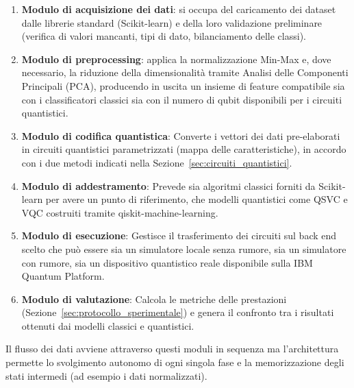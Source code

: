 \begin{enumerate}
    \item \textbf{Modulo di acquisizione dei dati}: si occupa del caricamento dei dataset dalle librerie standard (Scikit-learn) e della loro validazione preliminare (verifica di valori mancanti, tipi di dato, bilanciamento delle classi).
    \item \textbf{Modulo di preprocessing}: applica la normalizzazione Min-Max e, dove necessario, la riduzione della dimensionalità tramite Analisi delle Componenti Principali (PCA), producendo in uscita un insieme di feature compatibile sia con i classificatori classici sia con il numero di qubit disponibili per i circuiti quantistici.
    \item \textbf{Modulo di codifica quantistica}: Converte i vettori dei dati pre-elaborati in circuiti quantistici parametrizzati (mappa delle caratteristiche), in accordo con i due metodi indicati nella Sezione~\ref{sec:circuiti_quantistici}.
    \item \textbf{Modulo di addestramento}: Prevede sia algoritmi classici forniti da Scikit-learn per avere un punto di riferimento, che modelli quantistici come QSVC e VQC costruiti tramite qiskit-machine-learning.
    \item \textbf{Modulo di esecuzione}: Gestisce il trasferimento dei circuiti sul back end scelto che può essere sia un simulatore locale senza rumore, sia un simulatore con rumore, sia un dispositivo quantistico reale disponibile sulla IBM Quantum Platform.
    \item \textbf{Modulo di valutazione}: Calcola le metriche delle prestazioni (Sezione~\ref{sec:protocollo_sperimentale}) e genera il confronto tra i risultati ottenuti dai modelli classici e quantistici.
\end{enumerate}

Il flusso dei dati avviene attraverso questi moduli in sequenza ma l'architettura permette lo svolgimento autonomo di ogni singola fase e la memorizzazione degli stati intermedi (ad esempio i dati normalizzati).

